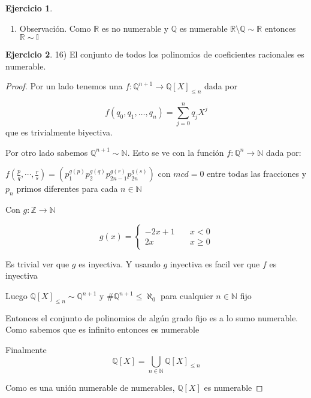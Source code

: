\documentclass[12pt]{article}
\newcommand{\n}{\aleph_{0}}
\newcommand{\Q}{\mathbb{Q}}
\newcommand{\R}{\mathbb{R}}
\newcommand{\I}{\mathbb{I}}
\newcommand{\Z}{\mathbb{Z}}
\newcommand{\N}{\mathbb{N}}
\newcommand{\ra}{\rightarrow}
\theoremstyle{definition}
\newtheorem{ej}{Ejercicio}
\begin{document}
\begin{ej}
\begin{enumerate}
\begin{proof}
    Y por otro lado $f (((A \setminus B)\setminus C)^c) = B \cup C$

    Entonces $f(A\setminus B) = ((A\setminus B)\setminus C)) \cup (B\cup C) = A$


  \end{proof}
  \item Observación. Como $\R$ es no numerable y $\Q$ es numerable $\R \setminus \Q \sim \R$ entonces $\R \sim \I$
 
\end{enumerate}

\end{ej}

\begin{ej}
16) El conjunto de todos los polinomios de coeficientes racionales es numerable.

\begin{proof}

Por un lado tenemos una $f : \Q^{n+1} \ra \Q[X]_{\leq n}$ dada por

$$ f(q_{0},q_{1}, \dots , q_{n}) = \sum_{j = 0}^{n} q_{j}X^{j}$$ que es trivialmente biyectiva. 

Por otro lado sabemos $\Q^{n+1} \sim \N$. Esto se ve con la función $f: \Q^n \ra \N$ dada por:

$f(\frac{p}{q}, \cdots , \frac{r}{s} ) = (p_1^{g(p)}p_2^{g(q)}p_{2n-1}^{g(r)}p_{2n}^{g(s)})$ con $mcd = 0$ entre todas las fracciones y $p_n$ primos diferentes para cada $n \in \N$

\newpage

Con $g: \Z \ra \N$

$$
    g(x) = \left\{
        \begin{array}{ll}
		-2x + 1   & \quad  x < 0 \\
	         2x & \quad x \geq 0  
        \end{array}
    \right.
    $$

Es trivial ver que $g$ es inyectiva. Y usando $g$ inyectiva es facil ver que $f$ es inyectiva 

Luego $ \Q[X]_{\leq n} \sim \Q^{n+1}  $ y $\# \Q^{n+1} \leq \n$  para cualquier $n \in \N$ fijo

Entonces el conjunto de polinomios de algún grado fijo es a lo sumo numerable. Como sabemos que es infinito entonces es numerable

Finalmente $$ \Q[X] = \bigcup_{n \in \N} \Q[X]_{\leq n}$$

Como es una unión numerable de numerables, $\Q[X]$ es numerable

\end{proof}

\end{ej}
\end{document}
